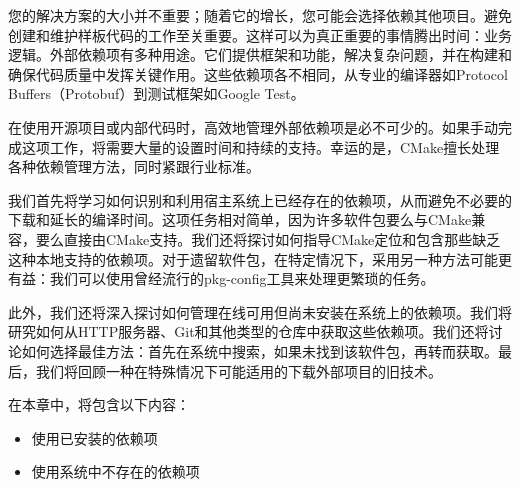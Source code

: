 您的解决方案的大小并不重要；随着它的增长，您可能会选择依赖其他项目。避免创建和维护样板代码的工作至关重要。这样可以为真正重要的事情腾出时间：业务逻辑。外部依赖项有多种用途。它们提供框架和功能，解决复杂问题，并在构建和确保代码质量中发挥关键作用。这些依赖项各不相同，从专业的编译器如Protocol Buffers（Protobuf）到测试框架如Google Test。

在使用开源项目或内部代码时，高效地管理外部依赖项是必不可少的。如果手动完成这项工作，将需要大量的设置时间和持续的支持。幸运的是，CMake擅长处理各种依赖管理方法，同时紧跟行业标准。

我们首先将学习如何识别和利用宿主系统上已经存在的依赖项，从而避免不必要的下载和延长的编译时间。这项任务相对简单，因为许多软件包要么与CMake兼容，要么直接由CMake支持。我们还将探讨如何指导CMake定位和包含那些缺乏这种本地支持的依赖项。对于遗留软件包，在特定情况下，采用另一种方法可能更有益：我们可以使用曾经流行的pkg-config工具来处理更繁琐的任务。

此外，我们还将深入探讨如何管理在线可用但尚未安装在系统上的依赖项。我们将研究如何从HTTP服务器、Git和其他类型的仓库中获取这些依赖项。我们还将讨论如何选择最佳方法：首先在系统中搜索，如果未找到该软件包，再转而获取。最后，我们将回顾一种在特殊情况下可能适用的下载外部项目的旧技术。

在本章中，将包含以下内容：

\begin{itemize}
\item
使用已安装的依赖项

\item
使用系统中不存在的依赖项
\end{itemize}

















